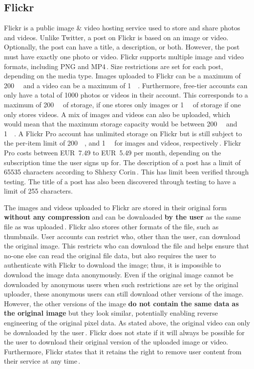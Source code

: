 \subsection{Flickr}
\label{subsec:ows_flickr}
Flickr is a public image \& video hosting service used to store and share photos and videos. Unlike Twitter, a post on Flickr is based on an image or video. Optionally, the post can  have a title, a description, or both. However, the post must have exactly one photo or video. Flickr supports multiple image and video formats, including PNG and MP4\,\cite{FlickrUploadRequirements2022}. Size restrictions are set for each post, depending on the media type. Images uploaded to Flickr can be a maximum of \SI{200}{\mega\byte} and a video can be a maximum of \SI{1}{\giga\byte}. Furthermore, \mbox{free-tier} accounts can only have a total of \num{1000} photos or videos in their account. This corresponds to a maximum of \SI{200}{\giga\byte} of storage, if one stores only images or \SI{1}{\tera\byte} of storage if one only stores videos. A mix of images and videos can also be uploaded, which would mean that the maximum storage capacity would be between \SI{200}{\giga\byte} and \SI{1}{\tera\byte}. A Flickr Pro account has unlimited storage on Flickr but is still subject to the \mbox{per-item} limit of \SI{200}{\mega\byte}, and \SI{1}{\giga\byte} for images and videos, respectively\,\cite{flickrinc.UpgradeEverythingYou}. Flickr Pro costs between EUR~7.49 to EUR~5.49 per month, depending on the subscription time the user signs up for. The description of a post has a limit of \num{65535} characters according to Shhexy Corin\,\cite{FlickrHelpForum2009}. This has limit been verified through testing. The title of a post has also been discovered through testing to have a limit of 255 characters.

The images and videos uploaded to Flickr are stored in their original form \textbf{without any compression} and can be downloaded \textbf{by the user} as the same file as was uploaded\,\cite{flickrinc.DownloadPermissions}. Flickr also stores other formats of the file, such as thumbnails. User accounts can restrict who, other than the user, can download the original image. This restricts who can download the file and helps ensure that \mbox{no-one} else can read the original file data, but also requires the user to authenticate with Flickr to download the image; thus, it is impossible to download the image data anonymously. Even if the original image cannot be downloaded by anonymous users when such restrictions are set by the original uploader, these anonymous users can still download other versions of the image. However, the other versions of the image \textbf{do not contain the same data as the original image} but they look similar, potentially enabling reverse engineering of the original pixel data. As stated above, the original video can only be downloaded by the user\,\cite{flickrinc.DownloadPermissions}. Flickr does not state if it will always be possible for the user to download their original version of the uploaded image or video. Furthermore, Flickr states that it retains the right to remove user content from their service at any time\,\cite{flickrinc.FlickrTermsConditions2020}.

